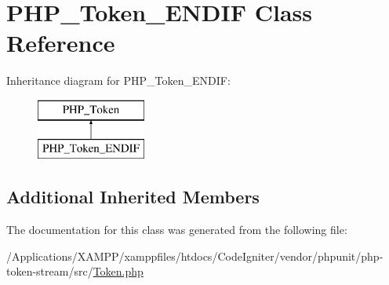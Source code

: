 \hypertarget{class_p_h_p___token___e_n_d_i_f}{}\section{P\+H\+P\+\_\+\+Token\+\_\+\+E\+N\+D\+IF Class Reference}
\label{class_p_h_p___token___e_n_d_i_f}
Inheritance diagram for P\+H\+P\+\_\+\+Token\+\_\+\+E\+N\+D\+IF\+:\begin{figure}[H]
\begin{center}
\leavevmode
\includegraphics[height=2.000000cm]{class_p_h_p___token___e_n_d_i_f}
\end{center}
\end{figure}
\subsection*{Additional Inherited Members}


The documentation for this class was generated from the following file\+:\begin{DoxyCompactItemize}
\item 
/\+Applications/\+X\+A\+M\+P\+P/xamppfiles/htdocs/\+Code\+Igniter/vendor/phpunit/php-\/token-\/stream/src/\mbox{\hyperlink{_token_8php}{Token.\+php}}\end{DoxyCompactItemize}
